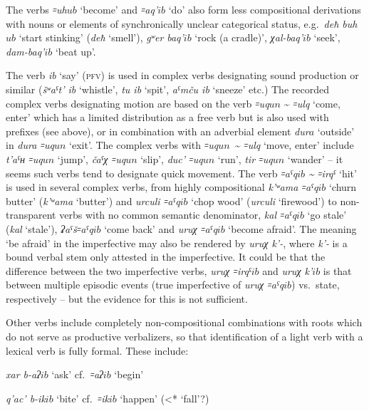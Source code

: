 \documentclass[output=paper]{langsci/langscibook}
\begin{document}
The verbs \emph{꞊uh\(ub\)} `become' and \emph{꞊aq'\(ib\)} `do' also form
less compositional derivations with nouns or elements of synchronically
unclear categorical status, e.g.\ \emph{deħ buh\(ub\)} `start stinking'
(\emph{deħ} `smell'), \emph{gʷer} \emph{baq'\(ib\)} `rock (a cradle)',
\emph{χal-baq'\(ib\)} `seek', \emph{dam-baq'\(ib\)} `beat up'.

The verb \emph{ib} `say' (\textsc{pfv}) is used in complex verbs designating
sound production or similar (\emph{šʷaˤt' ib} `whistle', \emph{tu ib}
`spit', \emph{aˤmču ib} `sneeze' etc.) The recorded complex verbs
designating motion are based on the verb \emph{꞊uq\(un\)} \textasciitilde{}
\emph{꞊ulq} `come, enter' which has a limited distribution as a free verb but
is also used with prefixes (see above), or in combination with an adverbial
element \emph{dur\(a\)} `outside' in \emph{dura ꞊uq\(un\)} `exit'. The
complex verbs with \emph{꞊uq\(un\)}~\textasciitilde{} \emph{꞊ulq} `move, enter'
include \emph{t'aˤʜ ꞊uq\(un\)} `jump', \emph{čaˤχ ꞊uq\(un\)} `slip',
\emph{duc' ꞊uq\(un\)} `run', \emph{tir ꞊uq\(un\)} `wander' – it seems such
verbs tend to designate quick movement. The verb \emph{꞊aˤq\(ib\)
\textasciitilde{} ꞊irqˤ} `hit' is used in several complex verbs, from
highly compositional \emph{k'ʷama ꞊aˤq\(ib\)} `churn butter'
(\emph{k'ʷama} `butter') and \emph{urculi ꞊aˤq\(ib\)} `chop wood'
(\emph{urculi} `firewood') to non-transparent verbs with no common
semantic denominator, \emph{kal ꞊aˤq\(ib\)} `go stale' (\emph{kal}
`stale'), \emph{ʡaˤš꞊aˤq\(ib\)} `come back' and \emph{uruχ ꞊aˤq\(ib\)}
`become afraid'. The meaning `be afraid' in the imperfective may also be
rendered by \emph{uruχ k'-}, where \emph{k'-} is a bound verbal stem
only attested in the imperfective. It could be that the difference
between the two imperfective verbs, \emph{uruχ ꞊irqˤ\(ib\)} and \emph{uruχ
k'\(ib\)} is that between multiple episodic events (true imperfective of
\emph{uruχ ꞊aˤq\(ib\)}) vs.\ state, respectively – but the evidence for
this is not sufficient.

Other verbs include completely non-compositional combinations with roots
which do not serve as productive verbalizers, so that identification of
a light verb with a lexical verb is fully formal. These include:

\ea %
\emph{xar b-aʔ\(ib\)} `ask' cf.\ \emph{꞊aʔ\(ib\)} `begin'

\ex %
\emph{q'ac' b-ik\(ib\)} `bite' cf.\ \emph{꞊ik\(ib\)}
`happen' (\textless{}* `fall'?)
\z
\end{document}
